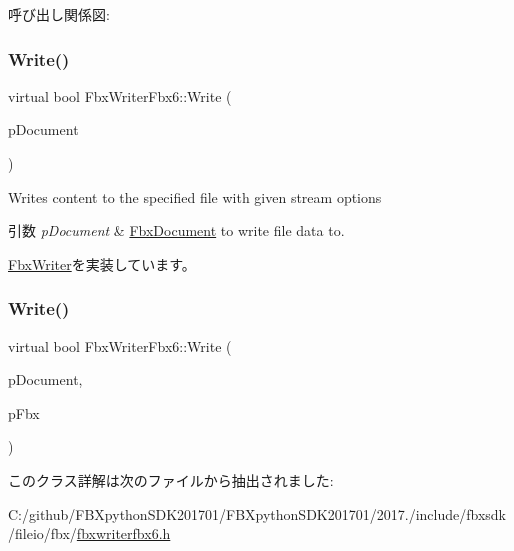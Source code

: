 呼び出し関係図\+:
\mbox{\label{class_fbx_writer_fbx6_a27073868a5a3c4b315e443032916d7d7}} 
\subsubsection{\texorpdfstring{Write()}{Write()}\hspace{0.1cm}{\footnotesize\ttfamily [1/2]}}
{\footnotesize\ttfamily virtual bool Fbx\+Writer\+Fbx6\+::\+Write (\begin{DoxyParamCaption}\item[{\hyperlink{class_fbx_document}{Fbx\+Document} $\ast$}]{p\+Document }\end{DoxyParamCaption})\hspace{0.3cm}{\ttfamily [virtual]}}

Writes content to the specified file with given stream options 
\begin{DoxyParams}{引数}
{\em p\+Document} & \hyperlink{class_fbx_document}{Fbx\+Document} to write file data to. \\
\hline
\end{DoxyParams}


\hyperlink{class_fbx_writer_aa8c0277611da0fdb0b9a184c55c30c2c}{Fbx\+Writer}を実装しています。

\mbox{\label{class_fbx_writer_fbx6_ac5b13eab3a34a36ad1fc63bde58e75bc}} 
\subsubsection{\texorpdfstring{Write()}{Write()}\hspace{0.1cm}{\footnotesize\ttfamily [2/2]}}
{\footnotesize\ttfamily virtual bool Fbx\+Writer\+Fbx6\+::\+Write (\begin{DoxyParamCaption}\item[{\hyperlink{class_fbx_document}{Fbx\+Document} $\ast$}]{p\+Document,  }\item[{\hyperlink{class_fbx_i_o}{Fbx\+IO} $\ast$}]{p\+Fbx }\end{DoxyParamCaption})\hspace{0.3cm}{\ttfamily [virtual]}}



このクラス詳解は次のファイルから抽出されました\+:\begin{DoxyCompactItemize}
\item 
C\+:/github/\+F\+B\+Xpython\+S\+D\+K201701/\+F\+B\+Xpython\+S\+D\+K201701/2017./include/fbxsdk/fileio/fbx/\hyperlink{fbxwriterfbx6_8h}{fbxwriterfbx6.\+h}\end{DoxyCompactItemize}
